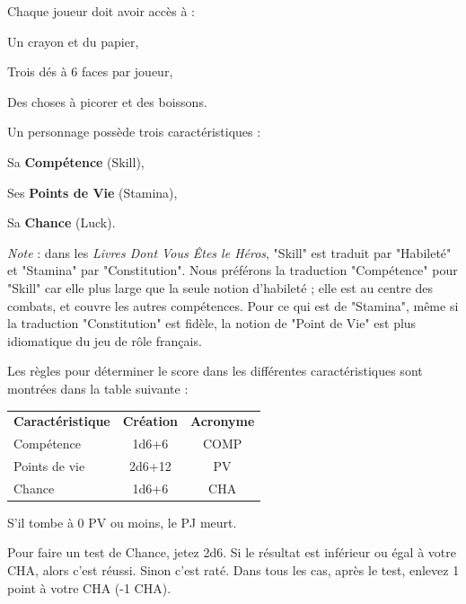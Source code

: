\begin{frame}[b]
{

Chaque joueur doit avoir accès à :
\begin{myitemize}
\item Un crayon et du papier,
\item Trois dés à 6 faces par joueur,
\item Des choses à picorer et des boissons.
\end{myitemize}



Un personnage possède trois caractéristiques :
\begin{myitemize}
\item Sa \textbf{Compétence} (Skill),
\item Ses \textbf{Points de Vie} (Stamina),
\item Sa \textbf{Chance} (Luck).
\end{myitemize}

\textit{Note} : dans les \textit{Livres Dont Vous Êtes le Héros}, "Skill" est traduit par "Habileté" et "Stamina" par "Constitution". Nous préférons la traduction "Compétence" pour "Skill" car elle plus large que la seule notion d'habileté ; elle est au centre des combats, et couvre les autres compétences. Pour ce qui est de "Stamina", même si la traduction "Constitution" est fidèle, la notion de "Point de Vie" est plus idiomatique du jeu de rôle français.

Les règles pour déterminer le score dans les différentes caractéristiques sont montrées dans la table suivante :

\begin{center}
\begin{tabular}{lcc}
\textbf{Caractéristique} & \textbf{Création} & \textbf{Acronyme} \\
Compétence        &      1d6+6 & COMP       \\
Points de vie     &     2d6+12 & PV         \\
Chance            &      1d6+6 & CHA        \\
\end{tabular}
\end{center}

S'il tombe à 0 PV ou moins, le PJ meurt.


Pour faire un test de Chance, jetez 2d6. Si le résultat est inférieur ou égal à votre CHA, alors c'est réussi. Sinon c'est raté. Dans tous les cas, après le test, enlevez 1 point à votre CHA (-1 CHA).

}
\end{frame}
